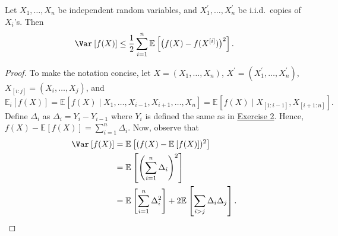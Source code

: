 \begin{theorem}\label{pf-thm:Efron-Stein-inequality}
	Let \(X_1, \dots , X_n\) be independent random variables, and \(X_1^{\prime} , \dots , X_n^{\prime} \) be i.i.d.\ copies of \(X_i\)'s. Then
	\[
		\Var_{}\left[f(X) \right] \leq \frac{1}{2} \sum_{i=1}^{n} \mathbb{E}_{}\left[\big(f(X) - f(X^{[i]}) \big)^2 \right].
	\]
\end{theorem}
\begin{proof}
	To make the notation concise, let \(X = (X_1, \dots , X_n)\), \(X^{\prime} = (X_1^{\prime} , \dots , X_n^{\prime} )\), \(X_{[i:j]} = (X_i, \dots , X_j)\), and
	\[
		\mathbb{E}_{i}\left[f(X) \right]
		= \mathbb{E}_{}\left[f(X) \mid X_1, \dots , X_{i-1}, X_{i+1}, \dots , X_n \right]
		= \mathbb{E}_{}\left[f(X) \mid X_{[1:i-1]}, X_{[i+1:n]} \right] .
	\]
	Define \(\Delta _i\) as \(\Delta _i = Y_i - Y_{i-1} \) where \(Y_i\) is defined the same as in \hyperref[ex2]{Exercise 2}. Hence, \(f(X) - \mathbb{E}_{}\left[f(X) \right] = \sum_{i=1}^{n} \Delta _i\). Now, observe that
	\[
		\begin{split}
			\Var_{}\left[f(X) \right]
			&= \mathbb{E}_{}\left[(f(X) - \mathbb{E}_{}\left[f(X) \right] )^2 \right]\\
			&= \mathbb{E}_{}\left[\left( \sum_{i=1}^{n} \Delta _i \right) ^2 \right]\\
			&= \mathbb{E}_{}\left[\sum_{i=1}^{n} \Delta _i ^2 \right] + 2 \mathbb{E}_{}\left[\sum_{i > j} \Delta _i \Delta _j \right] .
		\end{split}
	\]


\end{proof}
